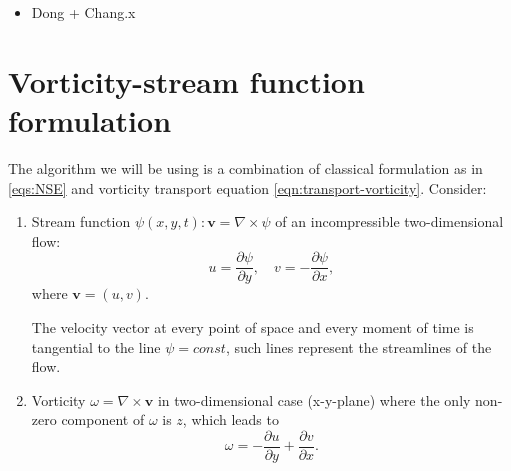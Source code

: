 \documentclass{article}
\numberwithin{equation}{section}
\begin{document}
{\begin{itemize}
	\item Dong + Chang.x
  \end{itemize}
}




\pagebreak
\section{Vorticity-stream function formulation}\label{sec:vorticity-streamfunction}
	The algorithm we will be using is a combination of classical formulation as in \cref{eqs:NSE} and vorticity transport equation \cref{eqn:transport-vorticity}.
	Consider:
	\begin{enumerate}
	\item
	Stream function $\psi(x,y,t):\boldsymbol{v}=\nabla \times \psi$ of an incompressible two-dimensional flow:
	\begin{equation}
	\label{eqn:streamfunction}
		u = \frac{\partial \psi}{\partial y},\quad v=-\frac{\partial \psi}{\partial x},
	\end{equation}
	where $\boldsymbol{v}=(u,v)$.
	
	The velocity vector at every point of space and every moment of time is tangential to the line $\psi = const$, such lines represent the streamlines of the flow. 
	\item
	
	Vorticity $\omega = \nabla \times \boldsymbol{v}$ in two-dimensional case (x-y-plane) where the only non-zero component of $\omega$ is $z$, which leads to
	\begin{equation}
	\label{eqn:vorticity}
		\omega=- \frac{\partial u}{\partial y}+\frac{\partial v}{\partial x} .
	\end{equation}
	\end{enumerate}
	
\end{document}
